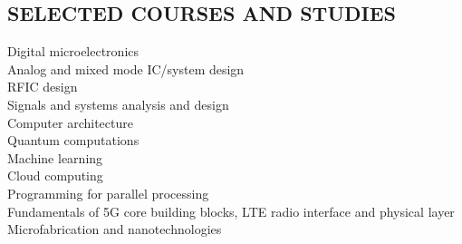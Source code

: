 \documentclass[margin , 10pt]{res} %
\begin{document}
\begin{resume}
		
		
		
		\section{SELECTED COURSES AND STUDIES}
		Digital microelectronics\\
		Analog and mixed mode IC/system design\\
		RFIC design\\
		Signals and systems analysis and design\\
		Computer architecture \\
		Quantum computations \\
		Machine learning \\
		Cloud computing \\
		Programming for parallel processing \\
		Fundamentals of 5G core building blocks, LTE radio interface and physical layer\\
		Microfabrication and nanotechnologies 
		

\end{resume}
\end{document}
